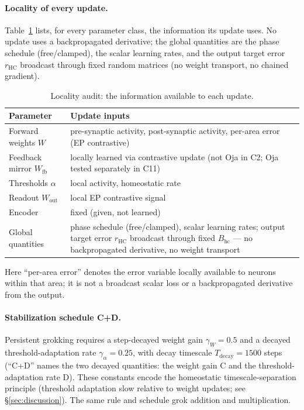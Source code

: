 \documentclass[11pt]{article}
\begin{document}
\paragraph{Locality of every update.} Table~\ref{tab:locality} lists, for every parameter class, the information its update uses. No update uses a backpropagated derivative; the global quantities are the phase schedule (free/clamped), the scalar learning rates, and the output target error $r_{\mathrm{HC}}$ broadcast through fixed random matrices (no weight transport, no chained gradient).
\begin{table}[ht]
\centering
\small
\begin{tabular}{ll}
\toprule
Parameter & Update inputs \\
\midrule
Forward weights $W$ & pre-synaptic activity, post-synaptic activity, per-area error (EP contrastive) \\
Feedback mirror $W_{\mathrm{fb}}$ & locally learned via contrastive update (not Oja in C2; Oja tested separately in C11) \\
Thresholds $\alpha$ & local activity, homeostatic rate \\
Readout $W_{\mathrm{out}}$ & local EP contrastive signal \\
Encoder & fixed (given, not learned) \\
Global quantities & phase schedule (free/clamped), scalar learning rates; output target error $r_{\mathrm{HC}}$ broadcast through fixed $B_{\mathrm{hc}}$ --- no backpropagated derivative, no weight transport \\
\bottomrule
\end{tabular}
\caption{Locality audit: the information available to each update.}
\label{tab:locality}
\end{table}
Here ``per-area error'' denotes the error variable locally available to neurons within that area; it is not a broadcast scalar loss or a backpropagated derivative from the output.

\paragraph{Stabilization schedule C+D.}
Persistent grokking requires a step-decayed weight gain $\gamma_W = 0.5$ and a decayed threshold-adaptation rate $\gamma_\alpha = 0.25$, with decay timescale $T_{\mathrm{decay}} = 1500$ steps (``C+D'' names the two decayed quantities: the weight gain C and the threshold-adaptation rate D). These constants encode the homeostatic timescale-separation principle (threshold adaptation slow relative to weight updates; see \S\ref{sec:discussion}). The same rule and schedule grok addition and multiplication.
\end{document}
